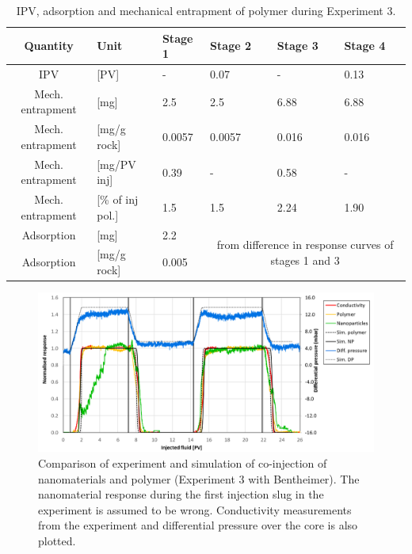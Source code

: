 \documentclass[energies,article,submit,moreauthors,pdftex]{Definitions/mdpi}
\begin{document}
\begin{table}[h!]
\small
\centering
\caption{IPV, adsorption and mechanical entrapment of polymer during Experiment 3.}
\label{tab:ipvexp3pol}
\begin{tabular}{c l l l l l } 
\toprule
\textbf{Quantity} & \textbf{Unit} & \textbf{Stage 1} & \textbf{Stage 2} & \textbf{Stage 3} & \textbf{Stage 4} \\ 
\midrule 
IPV                & [PV]           & -         & 0.07     & -         & 0.13     \\
Mech. entrapment   & [mg]          & 2.5       & 2.5      & 6.88       & 6.88       \\ 
Mech. entrapment   & [mg/g rock]   & 0.0057   & 0.0057     & 0.016     & 0.016     \\ 
Mech. entrapment   & [mg/PV inj]   & 0.39      & -         & 0.58      & -         \\
Mech. entrapment   & [\% of inj pol.]& 1.5       & 1.5       & 2.24       & 1.90       \\ 
Adsorption         & [mg]          & 2.2      &   \multicolumn{3}{c}{\multirow{2}{15em}{from difference in response curves of stages 1 and 3}}        \\
Adsorption         & [mg/g rock]   & 0.005      &  \multicolumn{3}{c}{}    \\ 
\bottomrule
\end{tabular}
\end{table}

\begin{figure}[h!]
    \centering
    \includegraphics[width=.8\textwidth]{fig/simExpNP3.png}
    \caption{Comparison of experiment and simulation of co-injection of nanomaterials and polymer (Experiment 3 with Bentheimer). The nanomaterial response during the first injection slug in the experiment is assumed to be wrong. Conductivity measurements from the experiment and differential pressure over the core is also plotted.}
    \label{cht:simExpNP3}
\end{figure}
\end{document}
